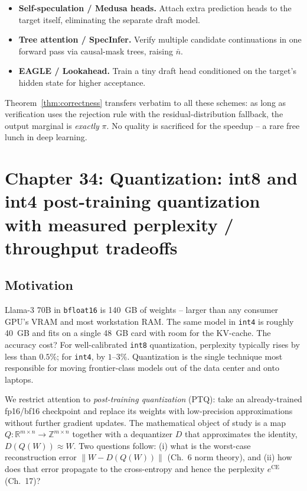 \documentclass[11pt]{article}
\theoremstyle{remark}
\begin{document}
\begin{itemize}
  \item \textbf{Self-speculation / Medusa heads.} Attach extra prediction heads to the target itself, eliminating the separate draft model.
  \item \textbf{Tree attention / SpecInfer.} Verify multiple candidate continuations in one forward pass via causal-mask trees, raising $\bar n$.
  \item \textbf{EAGLE / Lookahead.} Train a tiny draft head conditioned on the target's hidden state for higher acceptance.
\end{itemize}

Theorem~\ref{thm:correctness} transfers verbatim to all these schemes: as long as verification uses the rejection rule with the residual-distribution fallback, the output marginal is \emph{exactly} $\pi$. No quality is sacrificed for the speedup -- a rare free lunch in deep learning.


\section*{Chapter 34: Quantization: int8 and int4 post-training quantization with measured perplexity / throughput tradeoffs}

\subsection*{Motivation}

Llama-3 70B in \texttt{bfloat16} is 140~GB of weights -- larger than any consumer GPU's VRAM and most workstation RAM. The same model in \texttt{int4} is roughly 40~GB and fits on a single 48~GB card with room for the KV-cache. The accuracy cost? For well-calibrated \texttt{int8} quantization, perplexity typically rises by less than $0.5\%$; for \texttt{int4}, by $1$--$3\%$. Quantization is the single technique most responsible for moving frontier-class models out of the data center and onto laptops.

We restrict attention to \emph{post-training quantization} (PTQ): take an already-trained fp16/bf16 checkpoint and replace its weights with low-precision approximations without further gradient updates. The mathematical object of study is a map $Q : \mathbb{R}^{m\times n}\to\mathbb{Z}^{m\times n}$ together with a dequantizer $D$ that approximates the identity, $D(Q(W))\approx W$. Two questions follow: (i) what is the worst-case reconstruction error $\|W - D(Q(W))\|$ (Ch.~6 norm theory), and (ii) how does that error propagate to the cross-entropy and hence the perplexity $e^{\mathrm{CE}}$ (Ch.~17)?
\end{document}
